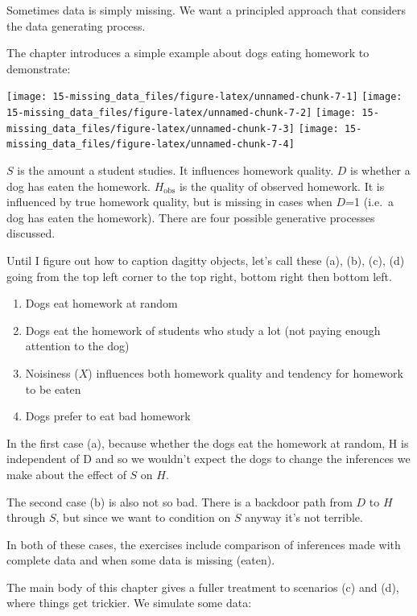 \documentclass[
]{book}
\providecommand{\tightlist}{%
  \setlength{\itemsep}{0pt}\setlength{\parskip}{0pt}}
\begin{document}
Sometimes data is simply missing. We want a principled approach that considers the data generating process.

The chapter introduces a simple example about dogs eating homework to demonstrate:

\texttt{[image: 15-missing\_data\_files/figure-latex/unnamed-chunk-7-1]} \texttt{[image: 15-missing\_data\_files/figure-latex/unnamed-chunk-7-2]} \texttt{[image: 15-missing\_data\_files/figure-latex/unnamed-chunk-7-3]} \texttt{[image: 15-missing\_data\_files/figure-latex/unnamed-chunk-7-4]}

\(S\) is the amount a student studies. It influences homework quality. \(D\) is whether a dog has eaten the homework. \(H_\text{obs}\) is the quality of observed homework. It is influenced by true homework quality, but is missing in cases when \(D\)=1 (i.e.~a dog has eaten the homework). There are four possible generative processes discussed.

Until I figure out how to caption dagitty objects, let's call these (a), (b), (c), (d) going from the top left corner to the top right, bottom right then bottom left.

\begin{enumerate}
\def\labelenumi{(\alph{enumi})}
\tightlist
\item
  Dogs eat homework at random
\item
  Dogs eat the homework of students who study a lot (not paying enough attention to the dog)
\item
  Noisiness (\(X\)) influences both homework quality and tendency for homework to be eaten
\item
  Dogs prefer to eat bad homework
\end{enumerate}

In the first case (a), because whether the dogs eat the homework at random, H is independent of D and so we wouldn't expect the dogs to change the inferences we make about the effect of \(S\) on \(H\).

The second case (b) is also not so bad. There is a backdoor path from \(D\) to \(H\) through \(S\), but since we want to condition on \(S\) anyway it's not terrible.

In both of these cases, the exercises include comparison of inferences made with complete data and when some data is missing (eaten).

The main body of this chapter gives a fuller treatment to scenarios (c) and (d), where things get trickier. We simulate some data:
\end{document}
